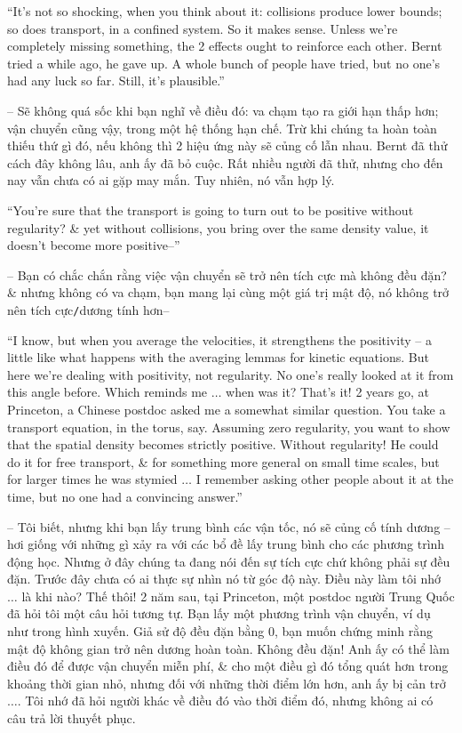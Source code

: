 \documentclass{article}
\begin{document}
\begin{enumerate}
	``It's not so shocking, when you think about it: collisions produce lower bounds; so does transport, in a confined system. So it makes sense. Unless we're completely missing something, the 2 effects ought to reinforce each other. Bernt tried a while ago, he gave up. A whole bunch of people have tried, but no one's had any luck so far. Still, it's plausible.''
	
	-- Sẽ không quá sốc khi bạn nghĩ về điều đó: va chạm tạo ra giới hạn thấp hơn; vận chuyển cũng vậy, trong một hệ thống hạn chế. Trừ khi chúng ta hoàn toàn thiếu thứ gì đó, nếu không thì 2 hiệu ứng này sẽ củng cố lẫn nhau. Bernt đã thử cách đây không lâu, anh ấy đã bỏ cuộc. Rất nhiều người đã thử, nhưng cho đến nay vẫn chưa có ai gặp may mắn. Tuy nhiên, nó vẫn hợp lý.
	
	``You're sure that the transport is going to turn out to be positive without regularity? \& yet without collisions, you bring over the same density value, it doesn't become more positive--''
	
	-- Bạn có chắc chắn rằng việc vận chuyển sẽ trở nên tích cực mà không đều đặn? \& nhưng không có va chạm, bạn mang lại cùng một giá trị mật độ, nó không trở nên tích cực{\tt/}dương tính hơn--
	
	``I know, but when you average the velocities, it strengthens the positivity -- a little like what happens with the averaging lemmas for kinetic equations. But here we're dealing with positivity, not regularity. No one's really looked at it from this angle before. Which reminds me $\ldots$ when was it? That's it! 2 years go, at Princeton, a Chinese postdoc asked me a somewhat similar question. You take a transport equation, in the torus, say. Assuming zero regularity, you want to show that the spatial density becomes strictly positive. Without regularity! He could do it for free transport, \& for something more general on small time scales, but for larger times he was stymied $\ldots$ I remember asking other people about it at the time, but no one had a convincing answer.''
	
	-- Tôi biết, nhưng khi bạn lấy trung bình các vận tốc, nó sẽ củng cố tính dương -- hơi giống với những gì xảy ra với các bổ đề lấy trung bình cho các phương trình động học. Nhưng ở đây chúng ta đang nói đến sự tích cực chứ không phải sự đều đặn. Trước đây chưa có ai thực sự nhìn nó từ góc độ này. Điều này làm tôi nhớ $\ldots$ là khi nào? Thế thôi! 2 năm sau, tại Princeton, một postdoc người Trung Quốc đã hỏi tôi một câu hỏi tương tự. Bạn lấy một phương trình vận chuyển, ví dụ như trong hình xuyến. Giả sử độ đều đặn bằng 0, bạn muốn chứng minh rằng mật độ không gian trở nên dương hoàn toàn. Không đều đặn! Anh ấy có thể làm điều đó để được vận chuyển miễn phí, \& cho một điều gì đó tổng quát hơn trong khoảng thời gian nhỏ, nhưng đối với những thời điểm lớn hơn, anh ấy bị cản trở $\ldots$. Tôi nhớ đã hỏi người khác về điều đó vào thời điểm đó, nhưng không ai có câu trả lời thuyết phục.
		

\end{enumerate}
\end{document}

